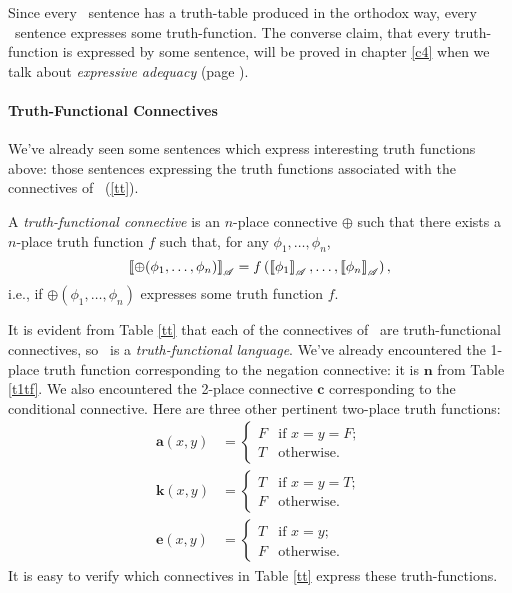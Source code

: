 Since every \lone\ sentence has a truth-table produced in the orthodox way, every \lone\ sentence expresses some truth-function.   The converse claim, that every truth-function is expressed by some sentence, will be proved in chapter \ref{c4} when we talk about \emph{expressive adequacy} (page \pageref{expressiveadeq}).




\paragraph{Truth-Functional Connectives} We've already seen some sentences which express interesting truth functions above: those  sentences expressing the truth functions associated with the connectives of \lone\ (\autoref{tt}). 
\begin{definition}\label{tfc}
	A \emph{truth-functional connective} is an $n$-place connective $\oplus$ such that there exists a $n$-place truth function $f$ such that, for any $\phi_{1},\ldots,\phi_{n}$, $$\left\llbracket \oplus(\phi_{1},\ldots,\phi_{n})\right\rrbracket_{\mathscr{A}} = f\left(\left\llbracket \phi_{1}\right\rrbracket_{\mathscr{A}},\ldots,\left\llbracket \phi_{n}\right\rrbracket_{\mathscr{A}}\right),$$ i.e., if $\oplus(\phi_{1},\ldots,\phi_{n})$ expresses some truth function $f$. 
\end{definition}
It is evident from Table \ref{tt}  that each of the connectives of \lone\ are truth-functional connectives, so \lone\ is a \emph{truth-functional language}. We've already encountered the 1-place truth function corresponding to the negation connective: it is $\mathbf{n}$ from Table \ref{t1tf}. We also encountered the 2-place connective $\mathbf{c}$ corresponding to the conditional connective. Here are three other pertinent two-place truth functions:
\begin{align*}
	\mathbf{a}(x,y) &= \begin{cases} F &\text{if } x =  y = F;\\ 
T &\text{otherwise}.\end{cases}\\
 \mathbf{k}(x,y) &= \begin{cases} T &\text{if } x = y = T;\\
F &\text{otherwise}.\end{cases}\\
\mathbf{e}(x,y) &= \begin{cases} T &\text{if } x = y;\\
F &\text{otherwise}.\end{cases}
\end{align*}
It is easy to verify which connectives in Table \ref{tt} express these truth-functions.

